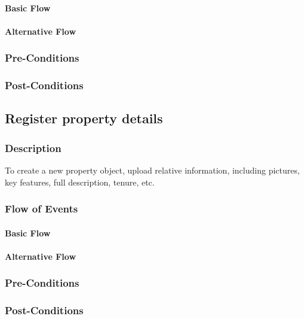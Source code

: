 \documentclass[a4paper,12pt]{article}
\begin{document}
\paragraph{Basic Flow}
\begin{itemize}
\end{itemize}
\paragraph{Alternative Flow}
\begin{itemize}
\end{itemize}
\subsubsection{Pre-Conditions}
\subsubsection{Post-Conditions}

\subsection{Register property details}
\subsubsection{Description}
To create a new property object, upload relative information, including pictures, key features, full description, tenure, etc.
\subsubsection{Flow of Events}
\paragraph{Basic Flow}
\begin{itemize}
\end{itemize}
\paragraph{Alternative Flow}
\begin{itemize}
\end{itemize}
\subsubsection{Pre-Conditions}
\subsubsection{Post-Conditions}
\end{document}
